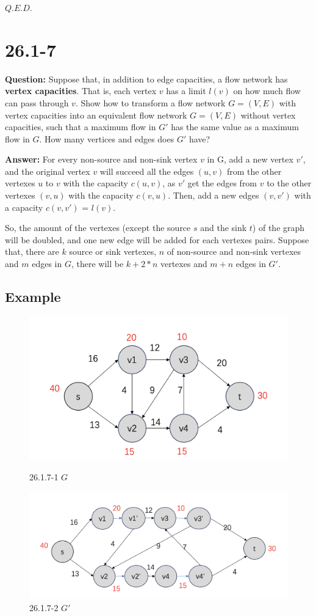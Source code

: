\documentclass[12pt]{article}
\begin{document}
$Q.E.D.$

\section{26.1-7}

\textbf{Question:} Suppose that, in addition to edge capacities, a flow network has \textbf{vertex capacities}. That is, each vertex $v$ has a limit $l(v)$ on how much flow can pass through $v$. Show how to transform a flow network $G = (V, E) $ with vertex capacities into an equivalent flow network $G = (V, E) $ without vertex capacities, such that a maximum flow in $G'$ has the same value as a maximum flow in $G$. How many vertices and edges does  $G'$ have?

\textbf{Answer:} 
For every non-source and non-sink vertex $v$ in G, add a new vertex $v'$, and the original vertex $v$ will succeed all the edges $(u, v)$ from the other vertexes $u$ to $v$ with the capacity $c(u, v)$, as $v'$ get the edges from $v$ to the other vertexes $(v, u)$ with the capacity  $c(v, u)$.
Then, add a new edges  $(v, v')$ with a capacity $c(v, v')$ = $l(v)$.

So, the amount of the vertexes (except the source $s$ and the sink $t$) of the graph will be doubled, and one new edge will be added for each vertexes pairs. 
Suppose that, there are $k$ source or sink vertexes, $n$ of non-source and non-sink vertexes and $m$ edges in $G$, there will be $k + 2*n$ vertexes and $m + n$ edges in $G'$.

\subsection{Example}
\begin{figure}[h]
    \centering
    \includegraphics[width=0.5\linewidth]{26.1.7-1.png}
    \caption{26.1.7-1 $G$}
    \includegraphics[width=0.5\linewidth]{26.1.7-2.png}
    \caption{26.1.7-2 $G'$}
    \label{fig:enter-label}

\end{figure}
\end{document}
